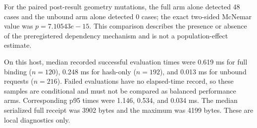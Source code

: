 {For the paired post-result geometry mutations, the full arm alone detected
48 cases and the unbound arm alone detected
0 cases; the exact two-sided McNemar value was
$p=7.10543e-15$. This comparison describes the
presence or absence of the preregistered dependency mechanism and is not a
population-effect estimate.

On this host, median recorded successful evaluation times were
0.619 ms for full binding
($n=120$), 0.248 ms for
hash-only ($n=192$), and
0.013 ms for unbound requests
($n=216$). Failed evaluations have no elapsed-time
record, so these samples are conditional and must not be compared as balanced
performance arms. Corresponding p95 times were 1.146,
0.534, and 0.034 ms.
The median serialized full receipt was 3902 bytes and the maximum
was 4199 bytes. These are local diagnostics only.
}
